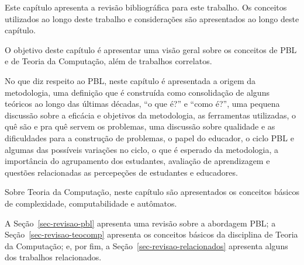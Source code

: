 \label{cap-revisao}
\acresetall

Este capítulo apresenta a revisão bibliográfica para este trabalho.
Os conceitos utilizados ao longo deste trabalho e considerações
são apresentados ao longo deste capítulo.

O objetivo deste capítulo é apresentar uma visão geral sobre os conceitos
de \ac{PBL} e de Teoria da Computação, além de trabalhos correlatos.

No que diz respeito ao \ac{PBL}, neste capítulo é apresentada a origem da metodologia,
uma definição que é construída como consolidação de alguns teóricos ao longo das últimas
décadas, ``o que é?'' e ``como é?'', uma pequena discussão sobre a eficácia e objetivos
da metodologia, as ferramentas utilizadas, o quê são e pra quê servem os problemas, uma
discussão sobre qualidade e as dificuldades para a construção de problemas, o papel
do educador, o ciclo \ac{PBL} e algumas das possíveis variações no ciclo, o que é
esperado da metodologia, a importância do agrupamento dos estudantes,
avaliação de aprendizagem e questões relacionadas as percepeções de estudantes
e educadores.

Sobre Teoria da Computação, neste capítulo são apresentados os conceitos
básicos de complexidade, computabilidade e autômatos.

A Seção~\ref{sec-revisao-pbl} apresenta uma revisão sobre a abordagem \ac{PBL};
a Seção~\ref{sec-revisao-teocomp} apresenta os conceitos básicos da disciplina
de Teoria da Computação;
e, por fim, a Seção~\ref{sec-revisao-relacionados} apresenta alguns dos trabalhos
relacionados.




